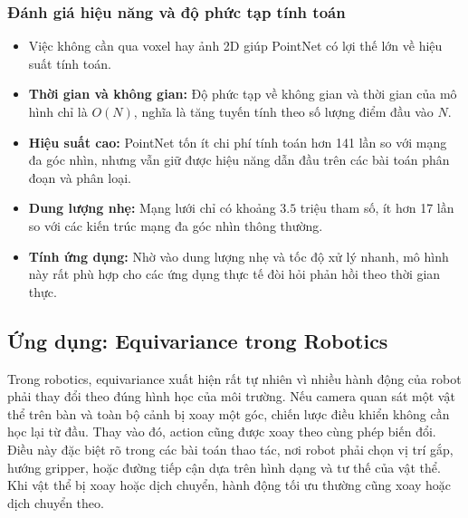 \subsubsection{Đánh giá hiệu năng và độ phức tạp tính toán}

\begin{itemize}
    \item Việc không cần qua voxel hay ảnh 2D giúp PointNet có lợi thế lớn về hiệu suất tính toán.
    \item \textbf{Thời gian và không gian:} Độ phức tạp về không gian và thời gian của mô hình chỉ là $O(N)$, nghĩa là tăng tuyến tính theo số lượng điểm đầu vào $N$.
    \item \textbf{Hiệu suất cao:} PointNet tốn ít chi phí tính toán hơn 141 lần so với mạng đa góc nhìn, nhưng vẫn giữ được hiệu năng dẫn đầu trên các bài toán phân đoạn và phân loại.
    \item \textbf{Dung lượng nhẹ:} Mạng lưới chỉ có khoảng $3.5$ triệu tham số, ít hơn 17 lần so với các kiến trúc mạng đa góc nhìn thông thường.
    \item \textbf{Tính ứng dụng:} Nhờ vào dung lượng nhẹ và tốc độ xử lý nhanh, mô hình này rất phù hợp cho các ứng dụng thực tế đòi hỏi phản hồi theo thời gian thực.
\end{itemize}


\subsection{Ứng dụng: Equivariance trong Robotics}
\label{subsec:robotics}


Trong robotics, equivariance xuất hiện rất tự nhiên vì nhiều hành động của robot phải thay đổi theo đúng hình học của môi trường. Nếu camera quan sát một vật thể trên bàn và toàn bộ cảnh bị xoay một góc, chiến lược điều khiển không cần học lại từ đầu. Thay vào đó, action cũng được xoay theo cùng phép biến đổi. Điều này đặc biệt rõ trong các bài toán thao tác, nơi robot phải chọn vị trí gắp, hướng gripper, hoặc đường tiếp cận dựa trên hình dạng và tư thế của vật thể. Khi vật thể bị xoay hoặc dịch chuyển, hành động tối ưu thường cũng xoay hoặc dịch chuyển theo.

